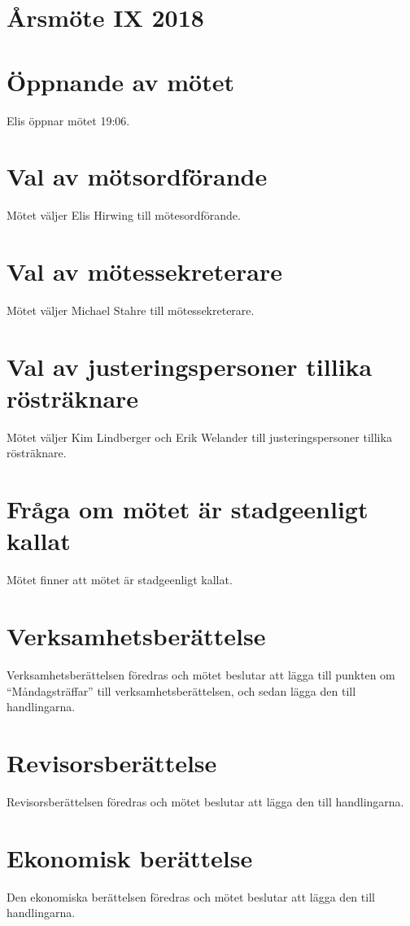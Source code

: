 \documentclass[a4paper,11pt,oneside]{article}
\begin{document}
\section*{Årsmöte IX 2018}

\section{Öppnande av mötet}
Elis öppnar mötet 19:06.

\section{Val av mötsordförande}
Mötet väljer Elis Hirwing till mötesordförande.

\section{Val av mötessekreterare}
Mötet väljer Michael Stahre till mötessekreterare.

\section{Val av justeringspersoner tillika rösträknare}
Mötet väljer Kim Lindberger och Erik Welander till justeringspersoner tillika rösträknare.

\section{Fråga om mötet är stadgeenligt kallat}
Mötet finner att mötet är stadgeenligt kallat.

\section{Verksamhetsberättelse}
Verksamhetsberättelsen föredras och mötet beslutar att lägga till punkten om
``Måndagsträffar'' till verksamhetsberättelsen, och sedan lägga den till handlingarna.

\section{Revisorsberättelse}
Revisorsberättelsen föredras och mötet beslutar att lägga den till handlingarna.

\section{Ekonomisk berättelse}
Den ekonomiska berättelsen föredras och mötet beslutar att lägga den till handlingarna.
\end{document}
